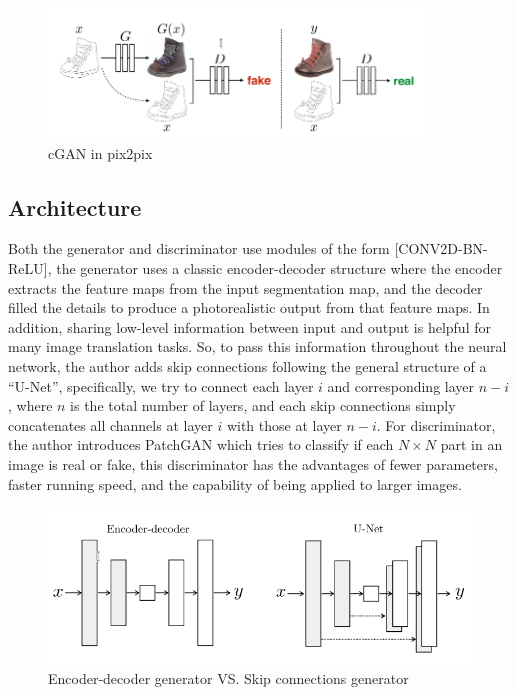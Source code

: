 \begin{figure}[H]
    \begin{center}
    \includegraphics[width=10cm]{figures/pix2pix-cGAN}
    \end{center}
    \caption{cGAN in pix2pix}
    \label{fig:pix2pix-cGAN}
\end{figure}

\subsection{Architecture}
Both the generator and discriminator use modules of the form [CONV2D-BN-ReLU], 
the generator uses a classic encoder-decoder structure where the encoder extracts
the feature maps from the input segmentation map, and the decoder filled the details 
to produce a photorealistic output from that feature maps. In addition, sharing 
low-level information between input and output is helpful for many image translation
tasks. So, to pass this information throughout the neural network, the author
adds skip connections following the general structure of a “U-Net”, specifically, we
try to connect each layer $i$ and corresponding layer $n-i$, where $n$ is the total number
of layers, and each skip connections simply concatenates all channels at layer $i$ 
with those at layer $n-i$. For discriminator, the author introduces PatchGAN which 
tries to classify if each $N \times N$ part in an image is real or fake, this
discriminator has the advantages of fewer parameters, faster running speed, and 
the capability of being applied to larger images.
\begin{figure}[H]
    \begin{center}
    \includegraphics[width=12cm]{figures/pix2pix-generator}
    \end{center}
    \caption{Encoder-decoder generator VS. Skip connections generator}
    \label{fig:pix2pix-generator}
\end{figure}

